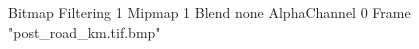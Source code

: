 {Bitmap
	{Filtering 1}
	{Mipmap 1}
	{Blend none}
	{AlphaChannel 0}
	{Frame "post_road_km.tif.bmp"}
}
